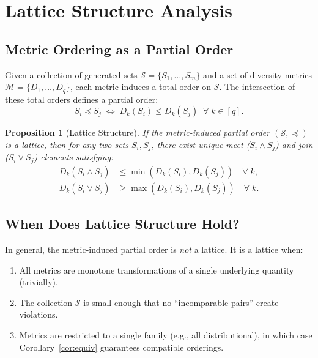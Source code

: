 \documentclass[11pt,a4paper]{article}
\newtheorem{proposition}[theorem]{Proposition}
\newcommand{\calS}{\mathcal{S}}
\newcommand{\calM}{\mathcal{M}}
\begin{document}
\section{Lattice Structure Analysis}\label{app:lattice}

\subsection{Metric Ordering as a Partial Order}

Given a collection of generated sets
$\calS = \{S_1, \ldots, S_m\}$ and a set of diversity
metrics $\calM = \{D_1, \ldots, D_q\}$, each metric
induces a total order on $\calS$.  The intersection of
these total orders defines a partial order:
\begin{equation}
  S_i \preceq S_j \;\Leftrightarrow\;
  D_k(S_i) \leq D_k(S_j) \;\;\forall\; k \in [q].
\end{equation}

\begin{proposition}[Lattice Structure]
If the metric-induced partial order $(\calS, \preceq)$
is a lattice, then for any two sets $S_i, S_j$, there
exist unique meet ($S_i \wedge S_j$) and join
($S_i \vee S_j$) elements satisfying:
\begin{align}
  D_k(S_i \wedge S_j) &\leq \min(D_k(S_i), D_k(S_j))
  \quad\forall\; k, \\
  D_k(S_i \vee S_j) &\geq \max(D_k(S_i), D_k(S_j))
  \quad\forall\; k.
\end{align}
\end{proposition}

\subsection{When Does Lattice Structure Hold?}

In general, the metric-induced partial order is \emph{not}
a lattice.  It is a lattice when:
\begin{enumerate}[leftmargin=2em,itemsep=2pt]
\item All metrics are monotone transformations of a single
      underlying quantity (trivially).
\item The collection $\calS$ is small enough that no
      ``incomparable pairs'' create violations.
\item Metrics are restricted to a single family
      (e.g., all distributional), in which case
      Corollary~\ref{cor:equiv} guarantees compatible
      orderings.
\end{enumerate}
\end{document}
